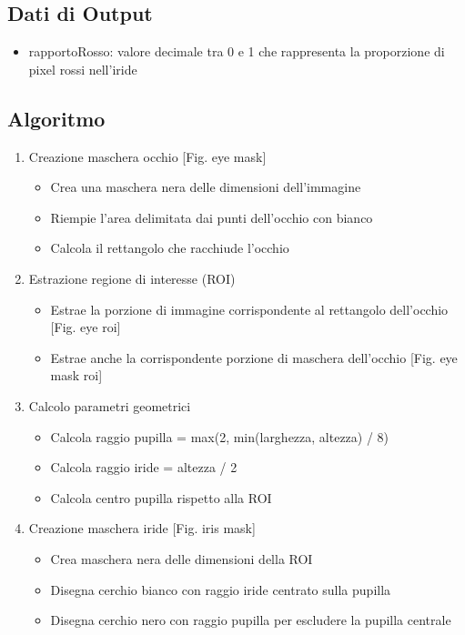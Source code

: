 \documentclass[12pt,a4paper,openright,twoside]{book}
\begin{document}
\subsection{Dati di Output}
\begin{itemize}
    \item rapportoRosso: valore decimale tra 0 e 1 che rappresenta la proporzione di pixel rossi nell'iride
\end{itemize}
\subsection{Algoritmo}
\begin{enumerate}
    \item Creazione maschera occhio [Fig. eye mask] \begin{itemize}
        \item Crea una maschera nera delle dimensioni dell'immagine
        \item Riempie l'area delimitata dai punti dell'occhio con bianco
        \item Calcola il rettangolo che racchiude l'occhio
    \end{itemize}
    \item Estrazione regione di interesse (ROI) \begin{itemize}
        \item Estrae la porzione di immagine corrispondente al rettangolo dell'occhio [Fig. eye roi]
        \item Estrae anche la corrispondente porzione di maschera dell'occhio [Fig. eye mask roi]
    \end{itemize}
    \item Calcolo parametri geometrici \begin{itemize}
        \item Calcola raggio pupilla = max(2, min(larghezza, altezza) / 8)
        \item Calcola raggio iride = altezza / 2
        \item Calcola centro pupilla rispetto alla ROI
    \end{itemize}
    \item Creazione maschera iride [Fig. iris mask] \begin{itemize}
        \item Crea maschera nera delle dimensioni della ROI
        \item Disegna cerchio bianco con raggio iride centrato sulla pupilla
        \item Disegna cerchio nero con raggio pupilla per escludere la pupilla centrale

\end{itemize}
\end{enumerate}
\end{document}
